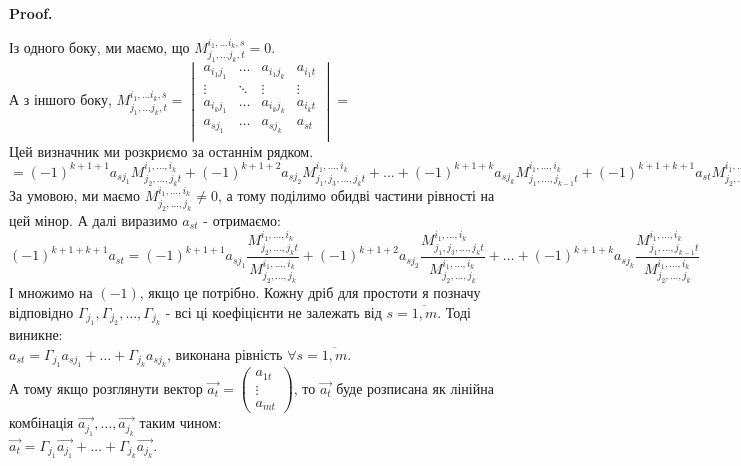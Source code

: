 \documentclass[a4paper, 10pt]{article}
\makeatletter
\def\qed{$\blacksquare$}
\theoremstyle{theoremdd}
\theoremstyle{theoremdd}
\theoremstyle{theoremdd}
\theoremstyle{theoremdd}
\theoremstyle{theoremdd}
\theoremstyle{theoremdd}
\theoremstyle{theoremdd}
\theoremstyle{theoremdd}
\renewenvironment{proof}[1][Proof.\\]{\par
\pushQED{\hfill \qed}%
\normalfont \topsep6\p@\@plus6\p@\relax
\trivlist
\item\relax
{\bfseries
#1\@addpunct{.}}\hspace\labelsep\ignorespaces
}{%
\popQED\endtrivlist\@endpefalse
}
\makeatother
\begin{document}
\begin{proof}
Із одного боку, ми маємо, що $M_{j_1,\dots j_k,t}^{i_1, \dots i_k,s} = 0$.\\
А з іншого боку, $M_{j_1,\dots j_k,t}^{i_1, \dots i_k,s} = \begin{vmatrix}
a_{i_1 j_1} & \dots & a_{i_1 j_k} & a_{i_1 t} \\
\vdots & \ddots & \vdots & \vdots \\
a_{i_k j_1} & \dots & a_{i_k j_k} & a_{i_k t} \\
a_{s j_1} & \dots & a_{s j_k} & a_{s t} \\
\end{vmatrix} \boxed{=}$\\
Цей визначник ми розкриємо за останнім рядком.\\
$\boxed{=} (-1)^{k+1+1} a_{sj_1} M_{j_2,\dots,j_k t}^{i_1,\dots,i_k} + (-1)^{k+1+2} a_{sj_2} M_{j_1,j_3,\dots,j_k t}^{i_1,\dots,i_k} + \dots + (-1)^{k+1+k} a_{sj_k}M_{j_1,\dots,j_{k-1} t}^{i_1,\dots,i_k} + (-1)^{k+1+k+1}a_{st} M_{j_2,\dots,j_k}^{i_1,\dots,i_k}$\\
За умовою, ми маємо $M_{j_2,\dots,j_k}^{i_1,\dots,i_k} \neq 0$, а тому поділимо обидві частини рівності на цей мінор. А далі виразимо $a_{st}$ - отримаємо:\\
$(-1)^{k+1+k+1}a_{st} = (-1)^{k+1+1} a_{sj_1} \dfrac{M_{j_2,\dots,j_k t}^{i_1,\dots,i_k}}{M_{j_2,\dots,j_k}^{i_1,\dots,i_k}}  + (-1)^{k+1+2} a_{sj_2} \dfrac{M_{j_1,j_3,\dots,j_k t}^{i_1,\dots,i_k}}{M_{j_2,\dots,j_k}^{i_1,\dots,i_k}} + \dots + (-1)^{k+1+k} a_{sj_k} \dfrac{M_{j_1,\dots,j_{k-1} t}^{i_1,\dots,i_k}}{M_{j_2,\dots,j_k}^{i_1,\dots,i_k}}$\\
І множимо на $(-1)$, якщо це потрібно. Кожну дріб для простоти я позначу відповідно $\Gamma_{j_1}, \Gamma_{j_2},\dots,\Gamma_{j_k}$ - всі ці коефіцієнти не залежать від $s = \overline{1,m}$. Тоді виникне:\\
$a_{st} = \Gamma_{j_1} a_{sj_1} + \dots + \Gamma_{j_k} a_{sj_k}$, виконана рівність $\forall s = \overline{1,m}$. \\
А тому якщо розглянути вектор $\vec{a_t} = \begin{pmatrix}
a_{1t} \\ \vdots \\ a_{mt}
\end{pmatrix}$, то $\vec{a_t}$ буде розписана як лінійна комбінація $\vec{a_{j_1}},\dots,\vec{a_{j_k}}$ таким чином:\\
$\vec{a_t} = \Gamma_{j_1} \vec{a_{j_1}} + \dots + \Gamma_{j_k} \vec{a_{j_k}}$.\\

\end{proof}
\end{document}
